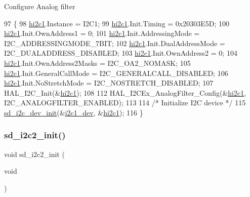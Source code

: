 Configure Analog filter
\begin{DoxyCode}
97 \{
98     \mbox{\hyperlink{group___s_d___i2_c___private___variables_gaf7b2c26e44dadaaa798a5c3d82914ba7}{hi2c1}}.Instance = I2C1;
99     \mbox{\hyperlink{group___s_d___i2_c___private___variables_gaf7b2c26e44dadaaa798a5c3d82914ba7}{hi2c1}}.Init.Timing = 0x20303E5D;
100     \mbox{\hyperlink{group___s_d___i2_c___private___variables_gaf7b2c26e44dadaaa798a5c3d82914ba7}{hi2c1}}.Init.OwnAddress1 = 0;
101     \mbox{\hyperlink{group___s_d___i2_c___private___variables_gaf7b2c26e44dadaaa798a5c3d82914ba7}{hi2c1}}.Init.AddressingMode = I2C\_ADDRESSINGMODE\_7BIT;
102     \mbox{\hyperlink{group___s_d___i2_c___private___variables_gaf7b2c26e44dadaaa798a5c3d82914ba7}{hi2c1}}.Init.DualAddressMode = I2C\_DUALADDRESS\_DISABLED;
103     \mbox{\hyperlink{group___s_d___i2_c___private___variables_gaf7b2c26e44dadaaa798a5c3d82914ba7}{hi2c1}}.Init.OwnAddress2 = 0;
104     \mbox{\hyperlink{group___s_d___i2_c___private___variables_gaf7b2c26e44dadaaa798a5c3d82914ba7}{hi2c1}}.Init.OwnAddress2Masks = I2C\_OA2\_NOMASK;
105     \mbox{\hyperlink{group___s_d___i2_c___private___variables_gaf7b2c26e44dadaaa798a5c3d82914ba7}{hi2c1}}.Init.GeneralCallMode = I2C\_GENERALCALL\_DISABLED;
106     \mbox{\hyperlink{group___s_d___i2_c___private___variables_gaf7b2c26e44dadaaa798a5c3d82914ba7}{hi2c1}}.Init.NoStretchMode = I2C\_NOSTRETCH\_DISABLED;
107     HAL\_I2C\_Init(&\mbox{\hyperlink{group___s_d___i2_c___private___variables_gaf7b2c26e44dadaaa798a5c3d82914ba7}{hi2c1}});
108 
112     HAL\_I2CEx\_AnalogFilter\_Config(&\mbox{\hyperlink{group___s_d___i2_c___private___variables_gaf7b2c26e44dadaaa798a5c3d82914ba7}{hi2c1}}, I2C\_ANALOGFILTER\_ENABLED);
113     
114     \textcolor{comment}{/* Initialize I2C device */}
115     \mbox{\hyperlink{group___s_d___i2_c___functions_ga5ca9adea5de20505761f892603bf8805}{sd\_i2c\_dev\_init}}(&\mbox{\hyperlink{group___s_d___i2_c___exported___variables_ga46fcd07cf43d192f6e66c43657a21d7b}{i2c1\_dev}}, &\mbox{\hyperlink{group___s_d___i2_c___private___variables_gaf7b2c26e44dadaaa798a5c3d82914ba7}{hi2c1}});
116 \}
\end{DoxyCode}
\mbox{\label{group___s_d___i2_c___functions_ga8ae735df0c54e25588a526d9a92d3a69}} 
\subsubsection{\texorpdfstring{sd\+\_\+i2c2\+\_\+init()}{sd\_i2c2\_init()}}
{\footnotesize\ttfamily void sd\+\_\+i2c2\+\_\+init (\begin{DoxyParamCaption}\item[{void}]{ }\end{DoxyParamCaption})}



